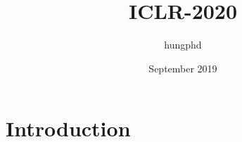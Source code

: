 \documentclass{article}
\title{ICLR-2020}
\author{hungphd }
\date{September 2019}
\begin{document}
\maketitle

\section{Introduction}
\end{document}
